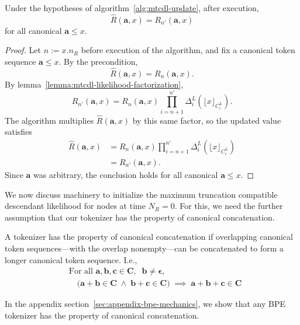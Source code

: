 \begin{theorem}
    Under the hypotheses of algorithm~\ref{alg:mtcdl-update},
    after execution,
    \[
    \widehat{R}(\mathbf{a}, x) = R_{n'}(\mathbf{a}, x)
    \]
    for all canonical $\mathbf{a} \leq x$.
\end{theorem}
\begin{proof}
    Let $n := x.n_R$ before execution of the algorithm, and fix a canonical
    token sequence $\mathbf{a} \leq x$.
    By the precondition,
    \[
    \widehat{R}(\mathbf{a}, x) = R_n(\mathbf{a}, x).
    \]
    By lemma~\ref{lemma:mtcdl-likelihood-factorization},
    \[
    R_{n'}(\mathbf{a}, x)
    =
    R_n(\mathbf{a}, x)
    \prod_{i=n+1}^{n'} \Delta^L_i(\lfloor x \rfloor_{C^L_i}).
    \]
    The algorithm multiplies $\widehat{R}(\mathbf{a}, x)$ by this same factor, so the
    updated value satisfies
    \begin{align*}
    \widehat{R}(\mathbf{a}, x)
    &=
    R_n(\mathbf{a}, x)
    \prod_{i=n+1}^{n'} \Delta^L_i(\lfloor x \rfloor_{C^L_i}) \\
    &=
    R_{n'}(\mathbf{a}, x).
    \end{align*}
    Since $\mathbf{a}$ was arbitrary, the conclusion holds for all canonical
    $\mathbf{a} \leq x$.
\end{proof}

We now discuss machinery to initialize the maximum truncation compatible descendant likelihood for nodes at time
$N_R=0$. 
For this, we need the further assumption that our
tokenizer has the property of canonical concatenation.

\begin{definition}
    A tokenizer has the property of canonical concatenation
    if overlapping canonical token sequences---with the overlap nonempty---can be concatenated to form a longer canonical token sequence.
    I.e.,
    $$
    \begin{aligned}
        &\text{For all } \mathbf{a}, \mathbf{b}, \mathbf{c} \in \mathbf{C}, \;\; \mathbf{b} \neq \mathbf{\epsilon}, \\
        &\quad \Big( \mathbf{a} + \mathbf{b} \in \mathbf{C} \;\land\; \mathbf{b} + \mathbf{c} \in \mathbf{C} \Big)
        \;\implies\; \mathbf{a} + \mathbf{b} + \mathbf{c} \in \mathbf{C}
    \end{aligned}
    $$
\end{definition}

In the appendix section~\ref{sec:appendix-bpe-mechanics},
we show that any BPE tokenizer has the property of canonical concatenation.

